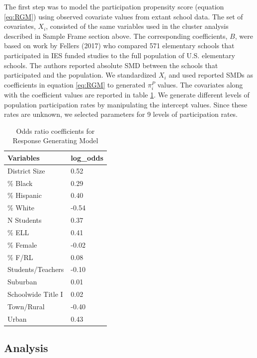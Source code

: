 \documentclass[man,floatsintext]{apa6}
\begin{document}
The first step was to model the participation propensity score (equation \eqref{eq:RGM}) using observed covariate values from extant school data. The set of covariates, \(X_i\), consisted of the same variables used in the cluster analysis described in Sample Frame section above. The corresponding coefficients, \(B\), were based on work by Fellers (2017) who compared 571 elementary schools that participated in IES funded studies to the full population of U.S. elementary schools. The authors reported absolute SMD between the schools that participated and the population. We standardized \(X_i\) and used reported SMDs as coefficients in equation \eqref{eq:RGM} to generated \(\pi^P_i\) values. The covariates along with the coefficient values are reported in table \ref{tab:tab-RGM-Pars}. We generate different levels of population participation rates by manipulating the intercept values. Since these rates are unknown, we selected parameters for 9 levels of participation rates.

\begin{table}[tbp]
\begin{center}
\begin{threeparttable}
\caption{\label{tab:tab-RGM-Pars}Odds ratio coefficients for Response Generating Model}
\begin{tabular}{ll}
\toprule
Variables & \multicolumn{1}{c}{log\_odds}\\
\midrule
District Size & 0.52\\
\% Black & 0.29\\
\% Hispanic & 0.40\\
\% White & -0.54\\
N Students & 0.37\\
\% ELL & 0.41\\
\% Female & -0.02\\
\% F/RL & 0.08\\
Students/Teachers & -0.10\\
Suburban & 0.01\\
Schoolwide Title I & 0.02\\
Town/Rural & -0.40\\
Urban & 0.43\\
\bottomrule
\end{tabular}
\end{threeparttable}
\end{center}
\end{table}



\hypertarget{analysis}{%
\subsection{Analysis}\label{analysis}}
\end{document}
